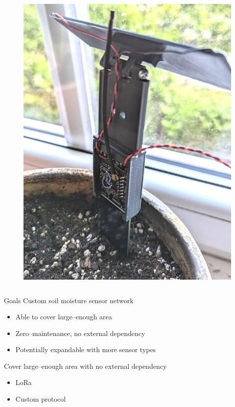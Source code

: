 \documentclass{beamer}
\begin{document}
\begin{frame}
\begin{columns}[T]
\begin{column}{.5\textwidth}
\begin{figure}
        \includegraphics[width=\linewidth]{../thesis/img/sensor-deploy-close.jpg}
    \end{figure}
\end{column}
\end{columns}
\end{frame}

\begin{frame}{Goals}
Custom soil moisture sensor network
\begin{itemize}
    \item Able to cover large--enough area
    \item Zero--maintenance, no external dependency
    \item Potentially expandable with more sensor types
\end{itemize}
\end{frame}

\begin{frame}{Cover large--enough area with no external dependency}
\begin{itemize}
    \item LoRa
    \item Custom protocol
\end{itemize}
\end{frame}
\end{document}
